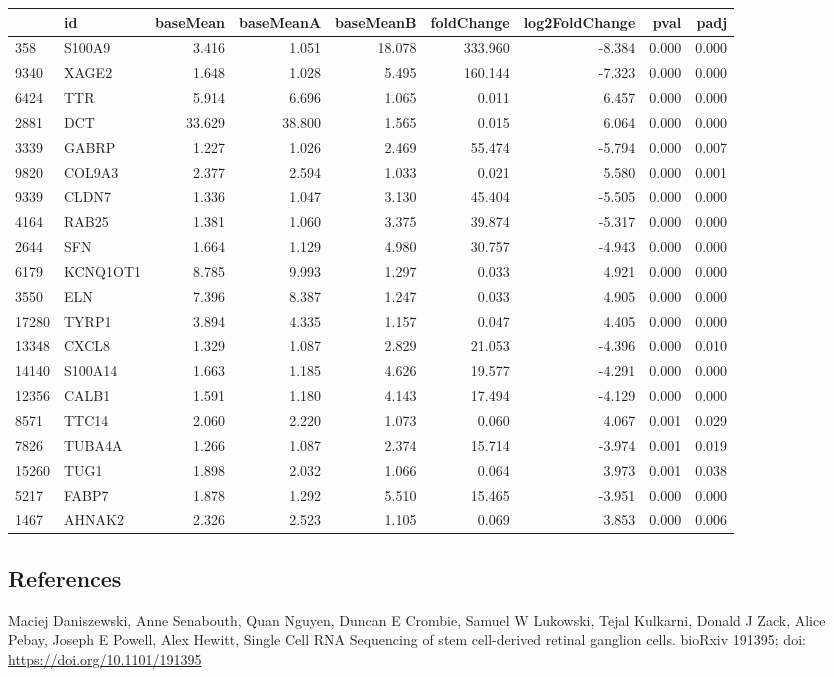 \documentclass[]{article}
\begin{document}
\begin{longtable}[]{@{}llrrrrrrr@{}}
\toprule
& id & baseMean & baseMeanA & baseMeanB & foldChange & log2FoldChange &
pval & padj\tabularnewline
\midrule
\endhead
358 & S100A9 & 3.416 & 1.051 & 18.078 & 333.960 & -8.384 & 0.000 &
0.000\tabularnewline
9340 & XAGE2 & 1.648 & 1.028 & 5.495 & 160.144 & -7.323 & 0.000 &
0.000\tabularnewline
6424 & TTR & 5.914 & 6.696 & 1.065 & 0.011 & 6.457 & 0.000 &
0.000\tabularnewline
2881 & DCT & 33.629 & 38.800 & 1.565 & 0.015 & 6.064 & 0.000 &
0.000\tabularnewline
3339 & GABRP & 1.227 & 1.026 & 2.469 & 55.474 & -5.794 & 0.000 &
0.007\tabularnewline
9820 & COL9A3 & 2.377 & 2.594 & 1.033 & 0.021 & 5.580 & 0.000 &
0.001\tabularnewline
9339 & CLDN7 & 1.336 & 1.047 & 3.130 & 45.404 & -5.505 & 0.000 &
0.000\tabularnewline
4164 & RAB25 & 1.381 & 1.060 & 3.375 & 39.874 & -5.317 & 0.000 &
0.000\tabularnewline
2644 & SFN & 1.664 & 1.129 & 4.980 & 30.757 & -4.943 & 0.000 &
0.000\tabularnewline
6179 & KCNQ1OT1 & 8.785 & 9.993 & 1.297 & 0.033 & 4.921 & 0.000 &
0.000\tabularnewline
3550 & ELN & 7.396 & 8.387 & 1.247 & 0.033 & 4.905 & 0.000 &
0.000\tabularnewline
17280 & TYRP1 & 3.894 & 4.335 & 1.157 & 0.047 & 4.405 & 0.000 &
0.000\tabularnewline
13348 & CXCL8 & 1.329 & 1.087 & 2.829 & 21.053 & -4.396 & 0.000 &
0.010\tabularnewline
14140 & S100A14 & 1.663 & 1.185 & 4.626 & 19.577 & -4.291 & 0.000 &
0.000\tabularnewline
12356 & CALB1 & 1.591 & 1.180 & 4.143 & 17.494 & -4.129 & 0.000 &
0.000\tabularnewline
8571 & TTC14 & 2.060 & 2.220 & 1.073 & 0.060 & 4.067 & 0.001 &
0.029\tabularnewline
7826 & TUBA4A & 1.266 & 1.087 & 2.374 & 15.714 & -3.974 & 0.001 &
0.019\tabularnewline
15260 & TUG1 & 1.898 & 2.032 & 1.066 & 0.064 & 3.973 & 0.001 &
0.038\tabularnewline
5217 & FABP7 & 1.878 & 1.292 & 5.510 & 15.465 & -3.951 & 0.000 &
0.000\tabularnewline
1467 & AHNAK2 & 2.326 & 2.523 & 1.105 & 0.069 & 3.853 & 0.000 &
0.006\tabularnewline
\bottomrule
\end{longtable}

\hypertarget{references}{%
\subsection{References}\label{references}}

Maciej Daniszewski, Anne Senabouth, Quan Nguyen, Duncan E Crombie,
Samuel W Lukowski, Tejal Kulkarni, Donald J Zack, Alice Pebay, Joseph E
Powell, Alex Hewitt, Single Cell RNA Sequencing of stem cell-derived
retinal ganglion cells. bioRxiv 191395; doi:
\url{https://doi.org/10.1101/191395}
\end{document}
